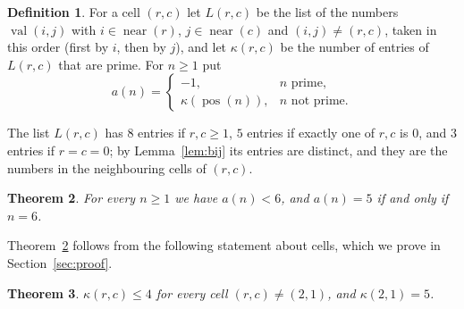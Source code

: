 \documentclass[11pt]{amsart}
\theoremstyle{plain}
\newtheorem{theorem}{Theorem}
\theoremstyle{definition}
\newtheorem{definition}[theorem]{Definition}
\newcommand{\val}{\operatorname{val}}
\newcommand{\pos}{\operatorname{pos}}
\newcommand{\near}{\operatorname{near}}
\begin{document}
\begin{definition}\label{def:a}
For a cell $(r,c)$ let $L(r,c)$ be the list of the numbers $\val(i,j)$ with $i\in\near(r)$, $j\in\near(c)$ and $(i,j)\ne(r,c)$, taken in this order (first by $i$, then by $j$), and let $\kappa(r,c)$ be the number of entries of $L(r,c)$ that are prime.
For $n\ge1$ put
\[
  a(n)=\begin{cases}-1, & n\text{ prime},\\ \kappa(\pos(n)), & n\text{ not prime}.\end{cases}
\]
\end{definition}

The list $L(r,c)$ has $8$ entries if $r,c\ge1$, $5$ entries if exactly one of $r,c$ is $0$, and $3$ entries if $r=c=0$; by Lemma~\ref{lem:bij} its entries are distinct, and they are the numbers in the neighbouring cells of $(r,c)$.

\begin{theorem}\label{thm:main}
For every $n\ge1$ we have $a(n)<6$, and $a(n)=5$ if and only if $n=6$.
\end{theorem}

Theorem~\ref{thm:main} follows from the following statement about cells, which we prove in Section~\ref{sec:proof}.

\begin{theorem}\label{thm:cells}
$\kappa(r,c)\le4$ for every cell $(r,c)\ne(2,1)$, and $\kappa(2,1)=5$.
\end{theorem}
\end{document}
